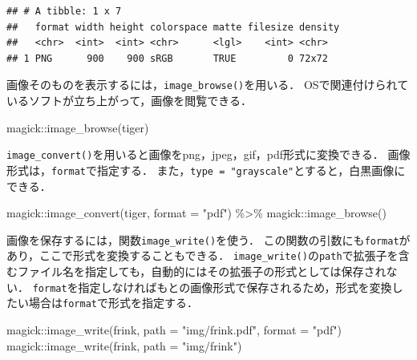 \documentclass[
]{article}
\newenvironment{Shaded}{\begin{snugshade}}{\end{snugshade}}
\newcommand{\AttributeTok}[1]{\textcolor[rgb]{0.77,0.63,0.00}{#1}}
\newcommand{\FunctionTok}[1]{\textcolor[rgb]{0.00,0.00,0.00}{#1}}
\newcommand{\NormalTok}[1]{#1}
\newcommand{\SpecialCharTok}[1]{\textcolor[rgb]{0.00,0.00,0.00}{#1}}
\newcommand{\StringTok}[1]{\textcolor[rgb]{0.31,0.60,0.02}{#1}}
\begin{document}
\begin{verbatim}
## # A tibble: 1 x 7
##   format width height colorspace matte filesize density
##   <chr>  <int>  <int> <chr>      <lgl>    <int> <chr>  
## 1 PNG      900    900 sRGB       TRUE         0 72x72
\end{verbatim}

画像そのものを表示するには，\texttt{image\_browse()}を用いる．
OSで関連付けられているソフトが立ち上がって，画像を閲覧できる．

\begin{Shaded}
\begin{Highlighting}[]
\NormalTok{magick}\SpecialCharTok{::}\FunctionTok{image\_browse}\NormalTok{(tiger)}
\end{Highlighting}
\end{Shaded}

\texttt{image\_convert()}を用いると画像をpng，jpeg，gif，pdf形式に変換できる．
画像形式は，\texttt{format}で指定する．
また，\texttt{type\ =\ "grayscale"}とすると，白黒画像にできる．

\begin{Shaded}
\begin{Highlighting}[]
\NormalTok{magick}\SpecialCharTok{::}\FunctionTok{image\_convert}\NormalTok{(tiger, }\AttributeTok{format =} \StringTok{"pdf"}\NormalTok{) }\SpecialCharTok{\%\textgreater{}\%}
\NormalTok{  magick}\SpecialCharTok{::}\FunctionTok{image\_browse}\NormalTok{()}
\end{Highlighting}
\end{Shaded}

画像を保存するには，関数\texttt{image\_write()}を使う．
この関数の引数にも\texttt{format}があり，ここで形式を変換することもできる．
\texttt{image\_write()}の\texttt{path}で拡張子を含むファイル名を指定しても，自動的にはその拡張子の形式としては保存されない．
\texttt{format}を指定しなければもとの画像形式で保存されるため，形式を変換したい場合は\texttt{format}で形式を指定する．

\begin{Shaded}
\begin{Highlighting}[]
\NormalTok{magick}\SpecialCharTok{::}\FunctionTok{image\_write}\NormalTok{(frink, }\AttributeTok{path =} \StringTok{"img/frink.pdf"}\NormalTok{, }\AttributeTok{format =} \StringTok{"pdf"}\NormalTok{) }
\NormalTok{magick}\SpecialCharTok{::}\FunctionTok{image\_write}\NormalTok{(frink, }\AttributeTok{path =} \StringTok{"img/frink"}\NormalTok{)}
\end{Highlighting}
\end{Shaded}
\end{document}
